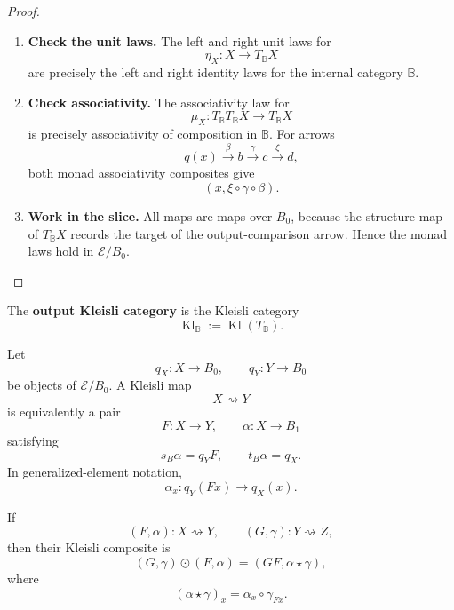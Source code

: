 \begin{proof}
    \leavevmode
    \begin{enumerate}
        \item \textbf{Check the unit laws.}
        The left and right unit laws for
        \[
            \eta_X:X\to T_{\mathbb B}X
        \]
        are precisely the left and right identity laws for the internal category
        \(\mathbb B\).

        \item \textbf{Check associativity.}
        The associativity law for
        \[
            \mu_X:T_{\mathbb B}T_{\mathbb B}X\to T_{\mathbb B}X
        \]
        is precisely associativity of composition in \(\mathbb B\). For arrows
        \[
            q(x)\xrightarrow{\beta}b
            \xrightarrow{\gamma}c
            \xrightarrow{\xi}d,
        \]
        both monad associativity composites give
        \[
            (x,\xi\circ\gamma\circ\beta).
        \]

        \item \textbf{Work in the slice.}
        All maps are maps over \(B_0\), because the structure map of
        \(T_{\mathbb B}X\) records the target of the output-comparison arrow.
        Hence the monad laws hold in \(\mathcal E/B_0\).
    \end{enumerate}
\end{proof}

\begin{definition}
\label{def:syn-to-output-kleisli-category}
    The \textbf{output Kleisli category} is the Kleisli category
    \[
        \operatorname{Kl}_{\mathbb B}:=\operatorname{Kl}(T_{\mathbb B}).
    \]
\end{definition}

\begin{lemma}
\label{lem:syn-to-kleisli-normal-form}
    Let
    \[
        q_X:X\to B_0,
        \qquad
        q_Y:Y\to B_0
    \]
    be objects of \(\mathcal E/B_0\). A Kleisli map
    \[
        X\rightsquigarrow Y
    \]
    is equivalently a pair
    \[
        F:X\to Y,
        \qquad
        \alpha:X\to B_1
    \]
    satisfying
    \[
        s_B\alpha=q_YF,
        \qquad
        t_B\alpha=q_X.
    \]
    In generalized-element notation,
    \[
        \alpha_x:q_Y(Fx)\to q_X(x).
    \]

    If
    \[
        (F,\alpha):X\rightsquigarrow Y,
        \qquad
        (G,\gamma):Y\rightsquigarrow Z,
    \]
    then their Kleisli composite is
    \[
        (G,\gamma)\odot(F,\alpha)
        =
        (GF,\alpha\star\gamma),
    \]
    where
    \[
        (\alpha\star\gamma)_x
        =
        \alpha_x\circ\gamma_{Fx}.
    \]
\end{lemma}

